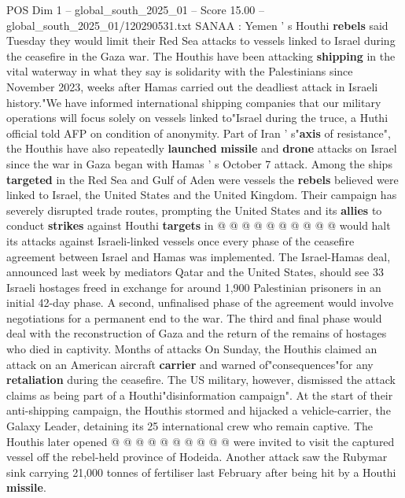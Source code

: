 \begin{textsample}{POS Dim 1 – global\_south\_2025\_01 – Score 15.00 – global\_south\_2025\_01/120290531.txt}  \label{ex:f1_pos_308}
SANAA : Yemen ' s Houthi \textbf{rebels} said Tuesday they would limit their Red Sea attacks to vessels linked to Israel during the ceasefire in the Gaza war.
The Houthis have been attacking \textbf{shipping} in the vital waterway in what they say is solidarity with the Palestinians since November 2023, weeks after Hamas carried out the deadliest attack in Israeli history."We have informed international shipping companies that our military operations will focus solely on vessels linked to"Israel during the truce, a Huthi official told AFP on condition of anonymity.
Part of Iran ' s"\textbf{axis} of resistance", the Houthis have also repeatedly \textbf{launched} \textbf{missile} and \textbf{drone} attacks on Israel since the war in Gaza began with Hamas ' s October 7 attack.
Among the ships \textbf{targeted} in the Red Sea and Gulf of Aden were vessels the \textbf{rebels} believed were linked to Israel, the United States and the United Kingdom.
Their campaign has severely disrupted trade routes, prompting the United States and its \textbf{allies} to conduct \textbf{strikes} against Houthi \textbf{targets} in @ @ @ @ @ @ @ @ @ @ would halt its attacks against Israeli-linked vessels once every phase of the ceasefire agreement between Israel and Hamas was implemented.
The Israel-Hamas deal, announced last week by mediators Qatar and the United States, should see 33 Israeli hostages freed in exchange for around 1,900 Palestinian prisoners in an initial 42-day phase.
A second, unfinalised phase of the agreement would involve negotiations for a permanent end to the war.
The third and final phase would deal with the reconstruction of Gaza and the return of the remains of hostages who died in captivity.
Months of attacks On Sunday, the Houthis claimed an attack on an American aircraft \textbf{carrier} and warned of"consequences"for any \textbf{retaliation} during the ceasefire.
The US military, however, dismissed the attack claims as being part of a Houthi"disinformation campaign".
At the start of their anti-shipping campaign, the Houthis stormed and hijacked a vehicle-carrier, the Galaxy Leader, detaining its 25 international crew who remain captive.
The Houthis later opened @ @ @ @ @ @ @ @ @ @ were invited to visit the captured vessel off the rebel-held province of Hodeida.
Another attack saw the Rubymar sink carrying 21,000 tonnes of fertiliser last February after being hit by a Houthi \textbf{missile}.

\end{textsample}
